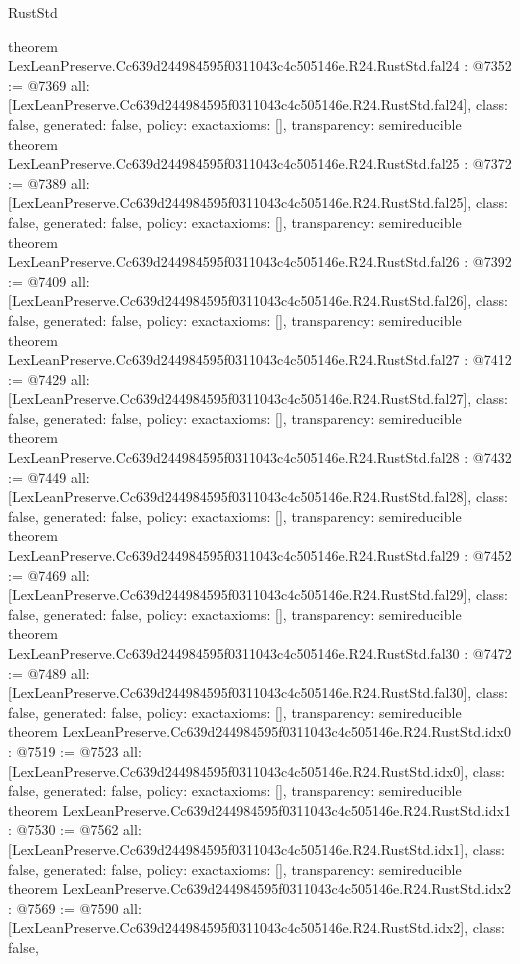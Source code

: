 \begin{lexlean}{RustStd}
\begin{coremodule}
{}
theorem LexLeanPreserve.Cc639d244984595f0311043c4c505146e.R24.RustStd.fal24 : @7352 := @7369 {
  all: [LexLeanPreserve.Cc639d244984595f0311043c4c505146e.R24.RustStd.fal24],
  class: false,
  generated: false,
  policy: exact{axioms: []},
  transparency: semireducible
}
theorem LexLeanPreserve.Cc639d244984595f0311043c4c505146e.R24.RustStd.fal25 : @7372 := @7389 {
  all: [LexLeanPreserve.Cc639d244984595f0311043c4c505146e.R24.RustStd.fal25],
  class: false,
  generated: false,
  policy: exact{axioms: []},
  transparency: semireducible
}
theorem LexLeanPreserve.Cc639d244984595f0311043c4c505146e.R24.RustStd.fal26 : @7392 := @7409 {
  all: [LexLeanPreserve.Cc639d244984595f0311043c4c505146e.R24.RustStd.fal26],
  class: false,
  generated: false,
  policy: exact{axioms: []},
  transparency: semireducible
}
theorem LexLeanPreserve.Cc639d244984595f0311043c4c505146e.R24.RustStd.fal27 : @7412 := @7429 {
  all: [LexLeanPreserve.Cc639d244984595f0311043c4c505146e.R24.RustStd.fal27],
  class: false,
  generated: false,
  policy: exact{axioms: []},
  transparency: semireducible
}
theorem LexLeanPreserve.Cc639d244984595f0311043c4c505146e.R24.RustStd.fal28 : @7432 := @7449 {
  all: [LexLeanPreserve.Cc639d244984595f0311043c4c505146e.R24.RustStd.fal28],
  class: false,
  generated: false,
  policy: exact{axioms: []},
  transparency: semireducible
}
theorem LexLeanPreserve.Cc639d244984595f0311043c4c505146e.R24.RustStd.fal29 : @7452 := @7469 {
  all: [LexLeanPreserve.Cc639d244984595f0311043c4c505146e.R24.RustStd.fal29],
  class: false,
  generated: false,
  policy: exact{axioms: []},
  transparency: semireducible
}
theorem LexLeanPreserve.Cc639d244984595f0311043c4c505146e.R24.RustStd.fal30 : @7472 := @7489 {
  all: [LexLeanPreserve.Cc639d244984595f0311043c4c505146e.R24.RustStd.fal30],
  class: false,
  generated: false,
  policy: exact{axioms: []},
  transparency: semireducible
}
theorem LexLeanPreserve.Cc639d244984595f0311043c4c505146e.R24.RustStd.idx0 : @7519 := @7523 {
  all: [LexLeanPreserve.Cc639d244984595f0311043c4c505146e.R24.RustStd.idx0],
  class: false,
  generated: false,
  policy: exact{axioms: []},
  transparency: semireducible
}
theorem LexLeanPreserve.Cc639d244984595f0311043c4c505146e.R24.RustStd.idx1 : @7530 := @7562 {
  all: [LexLeanPreserve.Cc639d244984595f0311043c4c505146e.R24.RustStd.idx1],
  class: false,
  generated: false,
  policy: exact{axioms: []},
  transparency: semireducible
}
theorem LexLeanPreserve.Cc639d244984595f0311043c4c505146e.R24.RustStd.idx2 : @7569 := @7590 {
  all: [LexLeanPreserve.Cc639d244984595f0311043c4c505146e.R24.RustStd.idx2],
  class: false,
}
\end{coremodule}
\end{lexlean}

